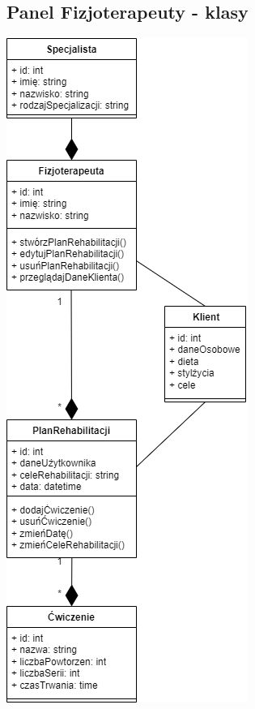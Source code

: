 \subsection{Panel Fizjoterapeuty - klasy}\label{subsec:panel-fizjoterapeuty-classes}

\includegraphics{../diagrams/class/fizjoterapeuta}